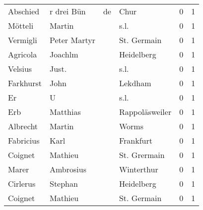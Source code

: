 \documentclass[10pt,a4paper,landscape]{article}
\begin{document}
\begin{longtable}{llllrr}
                 Abschied &                         r drei Bün &          de &                                        Chur &          0 &         1 \\
                  Mötteli &                             Martin &             &                                        s.l. &          0 &         1 \\
                 Vermigli &                       Peter Martyr &             &                                 St. Germain &          0 &         1 \\
                 Agricola &                            Joachlm &             &                                  Heidelberg &          0 &         1 \\
                  Velsius &                              Just. &             &                                        s.l. &          0 &         1 \\
                Farkhurst &                               John &             &                                     Lekdham &          0 &         1 \\
                       Er &                                  U &             &                                        s.l. &          0 &         1 \\
                      Erb &                           Matthias &             &                              Rappoläsweiler &          0 &         1 \\
                 Albrecht &                             Martin &             &                                       Worms &          0 &         1 \\
                Fabricius &                               Karl &             &                                   Frankfurt &          0 &         1 \\
                  Coignet &                            Mathieu &             &                                St. Grermain &          0 &         1 \\
                    Marer &                          Ambrosius &             &                                  Winterthur &          0 &         1 \\
                 Cirlerus &                            Stephan &             &                                  Heidelberg &          0 &         1 \\
                  Coignet &                            Mathieu &             &                                 St. Germain &          0 &         1 \\

\end{longtable}
\end{document}
